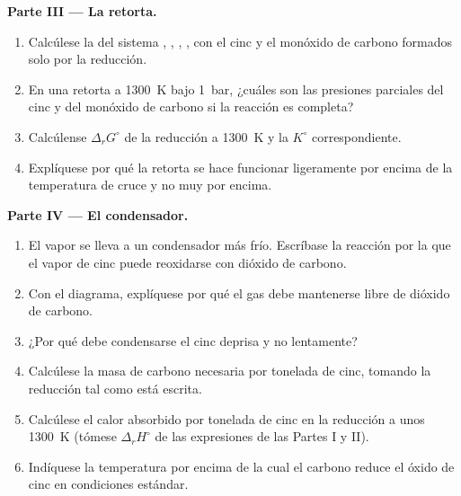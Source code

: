 \begin{problem}
\medskip
\noindent\textbf{Parte III --- La retorta.}
\begin{enumerate}[resume]
  \item Calcúlese la  del sistema , , ,
        , con el cinc y el monóxido de carbono formados solo por la reducción.
  \item En una retorta a \qty{1300}{K} bajo \qty{1}{bar}, ¿cuáles son las presiones
        parciales del cinc y del monóxido de carbono si la reacción es completa?
  \item Calcúlense $\Delta_r G^\circ$ de la reducción a \qty{1300}{K} y la
        $K^\circ$ correspondiente.
  \item Explíquese por qué la retorta se hace funcionar ligeramente por encima de la temperatura
        de cruce y no muy por encima.
\end{enumerate}

\medskip
\noindent\textbf{Parte IV --- El condensador.}
\begin{enumerate}[resume]
  \item El vapor se lleva a un condensador más frío. Escríbase la reacción por la que
        el vapor de cinc puede reoxidarse con dióxido de carbono.
  \item Con el diagrama, explíquese por qué el gas debe mantenerse libre de dióxido
        de carbono.
  \item ¿Por qué debe condensarse el cinc deprisa y no lentamente?
  \item Calcúlese la masa de carbono necesaria por tonelada de cinc, tomando la
        reducción tal como está escrita.
  \item Calcúlese el calor absorbido por tonelada de cinc en la reducción a unos
        \qty{1300}{K} (tómese $\Delta_r H^\circ$ de las expresiones de las Partes I
        y II).
  \item Indíquese la temperatura por encima de la cual el carbono reduce el óxido de cinc en
        condiciones estándar.
\end{enumerate}
\end{problem}
